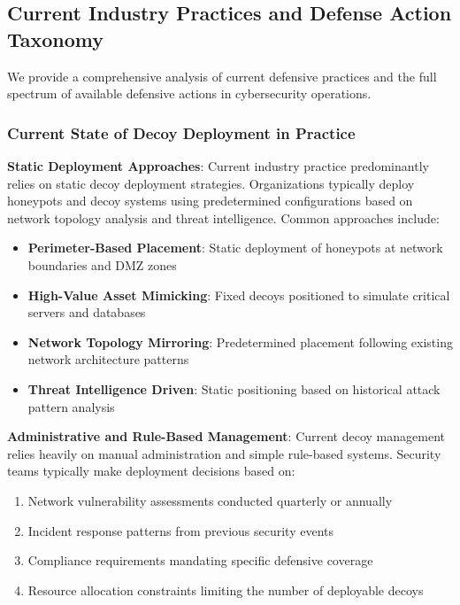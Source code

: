 \documentclass[12pt,oneside]{article}
\begin{document}
\subsection{Current Industry Practices and Defense Action Taxonomy}

We provide a comprehensive analysis of current defensive practices and the full spectrum of available defensive actions in cybersecurity operations.

\subsubsection{Current State of Decoy Deployment in Practice}

\textbf{Static Deployment Approaches}: Current industry practice predominantly relies on static decoy deployment strategies. Organizations typically deploy honeypots and decoy systems using predetermined configurations based on network topology analysis and threat intelligence. Common approaches include:

\begin{itemize}
\item \textbf{Perimeter-Based Placement}: Static deployment of honeypots at network boundaries and DMZ zones
\item \textbf{High-Value Asset Mimicking}: Fixed decoys positioned to simulate critical servers and databases  
\item \textbf{Network Topology Mirroring}: Predetermined placement following existing network architecture patterns
\item \textbf{Threat Intelligence Driven}: Static positioning based on historical attack pattern analysis
\end{itemize}

\textbf{Administrative and Rule-Based Management}: Current decoy management relies heavily on manual administration and simple rule-based systems. Security teams typically make deployment decisions based on:

\begin{enumerate}
\item Network vulnerability assessments conducted quarterly or annually
\item Incident response patterns from previous security events
\item Compliance requirements mandating specific defensive coverage
\item Resource allocation constraints limiting the number of deployable decoys
\end{enumerate}
\end{document}
